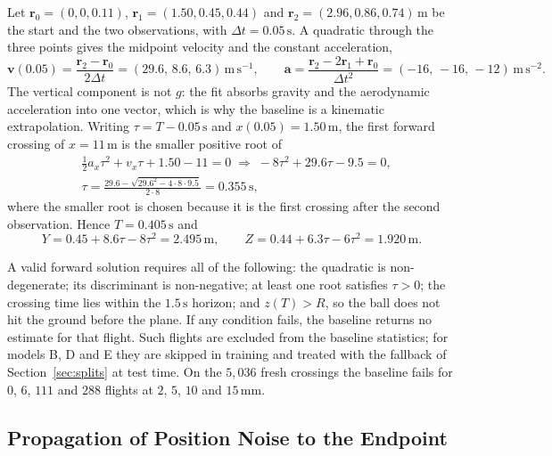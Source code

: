 \documentclass[11pt,a4paper]{article}
\begin{document}
Let $\mathbf{r}_0=(0,0,0.11)$, $\mathbf{r}_1=(1.50,0.45,0.44)$ and $\mathbf{r}_2=(2.96,0.86,0.74)\,\mathrm{m}$ be the start and the two observations, with $\Delta t=0.05\,\mathrm{s}$. A quadratic through the three points gives the midpoint velocity and the constant acceleration,
\begin{equation}
  \mathbf{v}(0.05)=\frac{\mathbf{r}_2-\mathbf{r}_0}{2\Delta t}=(29.6,\,8.6,\,6.3)\,\mathrm{m\,s^{-1}},
  \qquad
  \mathbf{a}=\frac{\mathbf{r}_2-2\mathbf{r}_1+\mathbf{r}_0}{\Delta t^{2}}=(-16,\,-16,\,-12)\,\mathrm{m\,s^{-2}}.
  \label{eq:baseline}
\end{equation}
The vertical component is not $g$: the fit absorbs gravity and the aerodynamic acceleration into one vector, which is why the baseline is a kinematic extrapolation. Writing $\tau=T-0.05\,\mathrm{s}$ and $x(0.05)=1.50\,\mathrm{m}$, the first forward crossing of $x=11\,\mathrm{m}$ is the smaller positive root of
\begin{equation}
\begin{aligned}
  &\tfrac12 a_x\tau^{2}+v_x\tau+1.50-11=0
  \;\Longrightarrow\;
  -8\tau^{2}+29.6\tau-9.5=0,\\
  &\tau=\frac{29.6-\sqrt{29.6^{2}-4\cdot8\cdot9.5}}{2\cdot8}=0.355\,\mathrm{s},
\end{aligned}
  \label{eq:tau}
\end{equation}
where the smaller root is chosen because it is the first crossing after the second observation. Hence $T=0.405\,\mathrm{s}$ and
\begin{equation}
  Y=0.45+8.6\tau-8\tau^{2}=2.495\,\mathrm{m},
  \qquad
  Z=0.44+6.3\tau-6\tau^{2}=1.920\,\mathrm{m}.
  \label{eq:baselineYZ}
\end{equation}

A valid forward solution requires all of the following: the quadratic is non-degenerate; its discriminant is non-negative; at least one root satisfies $\tau>0$; the crossing time lies within the $1.5\,\mathrm{s}$ horizon; and $z(T)>R$, so the ball does not hit the ground before the plane. If any condition fails, the baseline returns no estimate for that flight. Such flights are excluded from the baseline statistics; for models B, D and E they are skipped in training and treated with the fallback of Section~\ref{sec:splits} at test time. On the $5{,}036$ fresh crossings the baseline fails for $0$, $6$, $111$ and $288$ flights at $2$, $5$, $10$ and $15\,\mathrm{mm}$.

\subsection{Propagation of Position Noise to the Endpoint}
\end{document}
